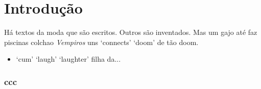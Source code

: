 \section{Introdução}
Há textos da moda que são escritos.
Outros são inventados.
Mas um gajo até faz piscinas colchao \emph{Vempiros} uns `connects' `doom' de tão doom.
\begin{itemize}

\item{ `cum' `laugh' `laughter' filha da...}
\end{itemize}



\subsubsection{ccc}
\label{sec:ccc}








\END

